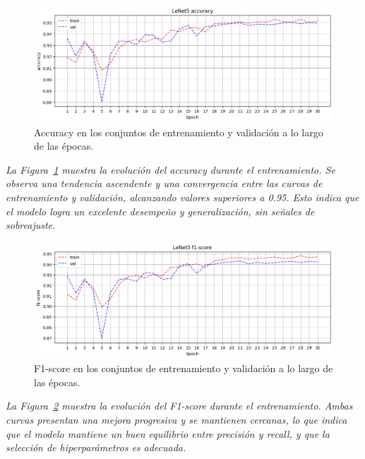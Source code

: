 \documentclass[conference]{IEEEtran}
\begin{document}
\begin{figure}[H]
    \centering
    \includegraphics[width=0.95\linewidth]{graphics-raw/raw-accuracy-train_val.png}
    \caption{Accuracy en los conjuntos de entrenamiento y validación a lo largo de las épocas.}
    \label{fig:raw-accuracy-train_val}
\end{figure}
\noindent\textit{
La Figura~\ref{fig:raw-accuracy-train_val} muestra la evolución del accuracy durante el entrenamiento. Se observa una tendencia ascendente y una convergencia entre las curvas de entrenamiento y validación, alcanzando valores superiores a 0.95. Esto indica que el modelo logra un excelente desempeño y generalización, sin señales de sobreajuste.
}

\begin{figure}[H]
    \centering
    \includegraphics[width=0.95\linewidth]{graphics-raw/raw-f1score-train_val.png}
    \caption{F1-score en los conjuntos de entrenamiento y validación a lo largo de las épocas.}
    \label{fig:raw-f1score-train_val}
\end{figure}
\noindent\textit{
La Figura~\ref{fig:raw-f1score-train_val} muestra la evolución del F1-score durante el entrenamiento. Ambas curvas presentan una mejora progresiva y se mantienen cercanas, lo que indica que el modelo mantiene un buen equilibrio entre precisión y recall, y que la selección de hiperparámetros es adecuada.
}
\end{document}
